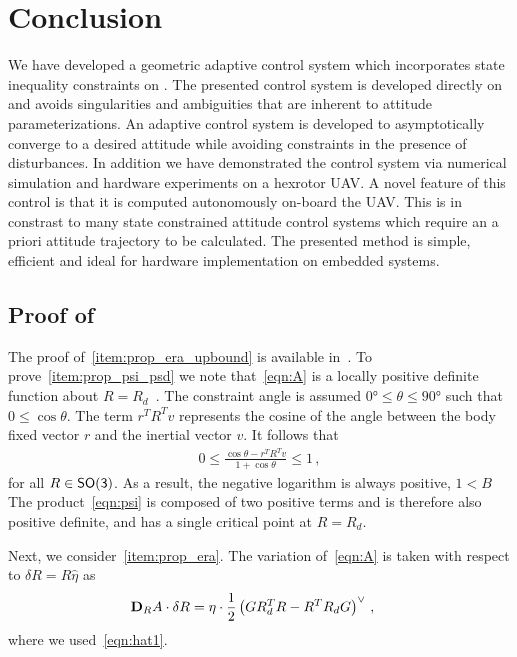 \documentclass[letterpaper, 10 pt, conference]{ieeeconf}  %
\begin{document}
\section{Conclusion}\label{sec:conclusion}
We have developed a geometric adaptive control system which incorporates state inequality constraints on \SO.
The presented control system is developed directly on \SO and avoids singularities and ambiguities that are inherent to attitude parameterizations.
An adaptive control system is developed to asymptotically converge to a desired attitude while avoiding constraints in the presence of disturbances.
In addition we have demonstrated the control system via numerical simulation and hardware experiments on a hexrotor UAV.
A novel feature of this control is that it is computed autonomously on-board the UAV.
This is in constrast to many state constrained attitude control systems which require an a priori attitude trajectory to be calculated. 
The presented method is simple, efficient and ideal for hardware implementation on embedded systems.



\appendix
\subsection{Proof of~}\label{proof:config_error}
The proof of~\cref{item:prop_era_upbound} is available in~\cite{lee2011a}.
To prove~\cref{item:prop_psi_psd} we note that~\cref{eqn:A} is a locally positive definite function about \( R = R_d \)~\cite{bullo2004}.
The constraint angle is assumed \( \ang{0} \leq \theta \leq \ang{90} \) such that \( 0 \leq \cos \theta \).
The term \( r^T R^T v \) represents the cosine of the angle between the body fixed vector \( r \) and the inertial vector \( v \). 
It follows that
\begin{align*}
	0 \leq  \frac{\cos \theta -  r^T R^T v}{1 + \cos \theta} \leq 1 \, ,
\end{align*}
for all \( R \in \mathsf{SO(3)} \). 
As a result, the negative logarithm is always positive, \(1 < B\)
The product~\cref{eqn:psi} is composed of two positive terms and is therefore also positive definite, and has a single critical point at \( R = R_d \).

Next, we consider~\cref{item:prop_era}.
The variation of~\cref{eqn:A} is taken with respect to \( \delta R = R \hat \eta \) as
\begin{align*}
	\mathbf{D}_{R} A \cdot \delta R &= \eta \cdot \frac{1}{2} \left( G R_d^T R - R^T R_d G\right)^\vee \, ,
\end{align*}
where we used~\cref{eqn:hat1}.
\end{document}
